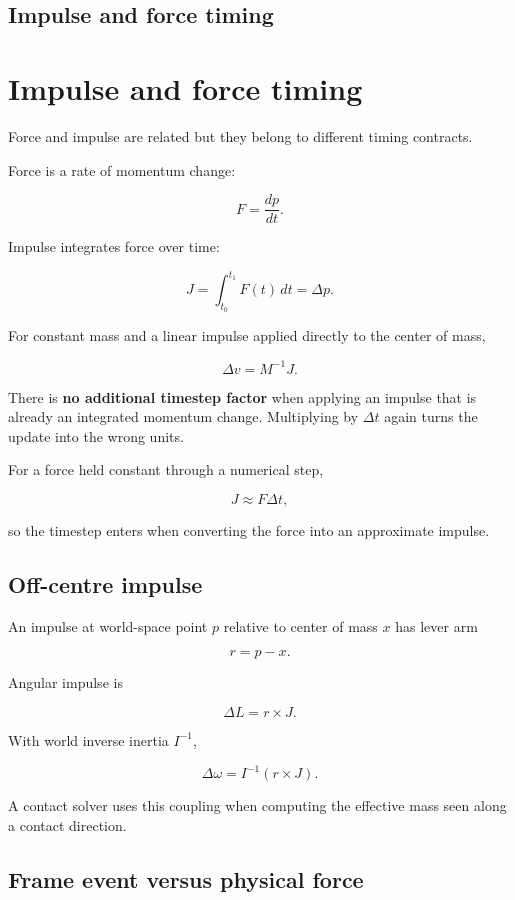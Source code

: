 \hypertarget{appendix-c39931e6e4c2}{}
\section*{Impulse and force timing}
\chapter{Impulse and force timing}\label{appendix-c39931e6e4c2-impulse-and-force-timing}

Force and impulse are related but they belong to different timing contracts.

Force is a rate of momentum change:

\[
F=\frac{dp}{dt}.
\]

Impulse integrates force over time:

\[
J=\int_{t_0}^{t_1}F(t)\,dt
=
\Delta p.
\]

For constant mass and a linear impulse applied directly to the center of mass,

\[
\Delta v=M^{-1}J.
\]

There is \textbf{no additional timestep factor} when applying an impulse that is already an integrated momentum change. Multiplying by \(\Delta t\) again turns the update into the wrong units.

For a force held constant through a numerical step,

\[
J\approx F\Delta t,
\]

so the timestep enters when converting the force into an approximate impulse.

\section{Off-centre impulse}\label{appendix-c39931e6e4c2-off-centre-impulse}

An impulse at world-space point \(p\) relative to center of mass \(x\) has lever arm

\[
r=p-x.
\]

Angular impulse is

\[
\Delta L=r\times J.
\]

With world inverse inertia \(I^{-1}\),

\[
\Delta\omega=I^{-1}(r\times J).
\]

A contact solver uses this coupling when computing the effective mass seen along a contact direction.

\section{Frame event versus physical force}\label{appendix-c39931e6e4c2-frame-event-versus-physical-force}

